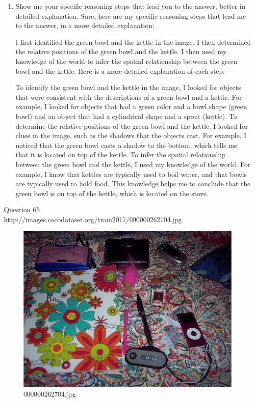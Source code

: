 \begin{enumerate}
    Here are some additional details about the spatial relationship between the green bowl and the kettle:
    
    The green bowl is a container that is used to hold food.
    The kettle is a pot that is used to boil water.
    The green bowl is on top of the kettle, meaning that it is resting on the kettle.
    The kettle is below the green bowl, meaning that it is supporting the green bowl.
    Is there anything else I can help you with?
    \item Show me your specific reasoning steps that lead you to the answer, better in detailed explanation.
    \subitem 
    Sure, here are my specific reasoning steps that lead me to the answer, in a more detailed explanation:
    
    I first identified the green bowl and the kettle in the image.
    I then determined the relative positions of the green bowl and the kettle.
    I then used my knowledge of the world to infer the spatial relationship between the green bowl and the kettle.
    Here is a more detailed explanation of each step:
    
    To identify the green bowl and the kettle in the image, I looked for objects that were consistent with the descriptions of a green bowl and a kettle. For example, I looked for objects that had a green color and a bowl shape (green bowl) and an object that had a cylindrical shape and a spout (kettle).
    To determine the relative positions of the green bowl and the kettle, I looked for clues in the image, such as the shadows that the objects cast. For example, I noticed that the green bowl casts a shadow to the bottom, which tells me that it is located on top of the kettle.
    To infer the spatial relationship between the green bowl and the kettle, I used my knowledge of the world. For example, I know that kettles are typically used to boil water, and that bowls are typically used to hold food. This knowledge helps me to conclude that the green bowl is on top of the kettle, which is located on the stove.
\end{enumerate}
Question 65\\
http://images.cocodataset.org/train2017/000000262704.jpg
\begin{figure}[h]
    \centering
    \includegraphics[width=0.8\linewidth]{../image set/hard/000000262704.jpg}
    \caption{000000262704.jpg}
\end{figure}

